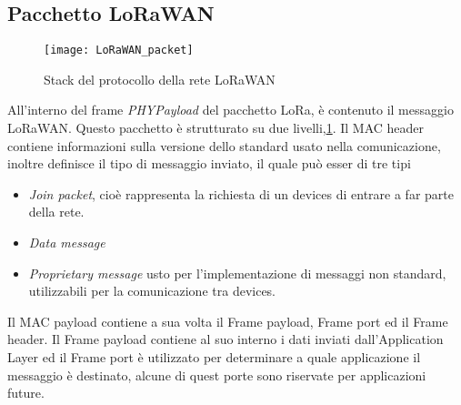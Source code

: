 \subsection{Pacchetto LoRaWAN}
\begin{figure}[h]
        \centering 
                \texttt{[image: LoRaWAN\_packet]}
        \caption{Stack del protocollo della rete LoRaWAN}
        \label{fig:stack_lora}
\end{figure}
All'interno del frame \emph{PHYPayload} del pacchetto LoRa,  è contenuto il
messaggio LoRaWAN. 
Questo pacchetto è strutturato su due livelli,\ref{fig:stack_lora}.
Il MAC header contiene informazioni sulla versione dello standard usato nella
comunicazione, inoltre definisce il tipo di messaggio inviato, il quale può
esser di tre tipi
\begin{itemize}
        \item   \textit{Join packet}, cioè rappresenta la richiesta di un devices
                di entrare a far parte della rete.
        \item   \textit{Data message}
        \item   \textit{Proprietary message} usto per l'implementazione di
                messaggi non standard, utilizzabili per la comunicazione tra devices.
\end{itemize}
Il MAC payload contiene a sua volta il Frame payload, Frame port ed il Frame
header. Il Frame payload contiene al suo interno i dati inviati dall'Application
Layer ed il Frame port è utilizzato per determinare a quale applicazione il
messaggio è destinato, alcune di quest porte sono riservate per applicazioni
future.
